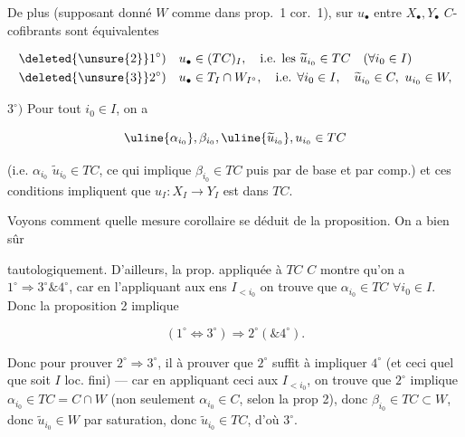  De plus (supposant donné $W$ comme dans prop.~1 cor.~1),   sur $u_\bullet$ entre $X_\bullet,Y_\bullet$ $C$-cofibrants sont équivalentes

\[
\begin{aligned}
\deleted{\unsure{2}}1^\circ)&\quad u_\bullet\in(TC)_I,\quad\text{i.e. les }\widetilde u_{i_0}\in TC\quad(\forall i_0\in I)\\
\deleted{\unsure{3}}2^\circ)&\quad u_\bullet\in T_I\cap W_{I^\circ},\quad\text{i.e. }\forall i_0\in I,\quad\widetilde u_{i_0}\in C,\ u_{i_0}\in W,
\end{aligned}
\]

 $3^\circ)$ Pour tout $i_0\in I$, on a

\[
 \uline{\alpha_{i_0}},\beta_{i_0},\uline{\widetilde u_{i_0}},u_{i_0}\in TC
\]

(i.e. $\alpha_{i_0}$ \unsure{\&} $\widetilde u_{i_0}\in TC$, ce qui implique $\beta_{i_0}\in TC$ puis  par  de base et par comp.) et ces conditions impliquent  que $u_I:X_I\to Y_I$ est dans $TC$.

Voyons comment  quelle mesure  corollaire se déduit de la proposition. On a bien sûr


tautologiquement. D’ailleurs, la prop. appliquée à $TC$  $C$ montre qu’on a $1^\circ\Rightarrow 3^\circ\mathbin{\&}4^\circ$, car en l’appliquant aux ens $I_{<i_0}$ on trouve que $\alpha_{i_0}\in TC$ $\forall i_0\in I$. Donc la proposition 2 implique

\[
 (1^\circ\Longleftrightarrow3^\circ)\Longrightarrow 2^\circ(\mathbin{\&}4^\circ).
\]


Donc pour prouver $2^\circ\Rightarrow3^\circ$, il  à prouver que $2^\circ$  suffit à impliquer $4^\circ$ (et ceci quel que soit $I$  loc. fini) --- car en appliquant ceci aux $I_{<i_0}$, on trouve que $2^\circ$ implique $\alpha_{i_0}\in TC=C\cap W$ (non seulement $\alpha_{i_0}\in C$, selon la prop 2), donc $\beta_{i_0}\in TC\subset W$, donc $\widetilde u_{i_0}\in W$ par saturation, donc $\widetilde u_{i_0}\in TC$, d’où $3^\circ$.

